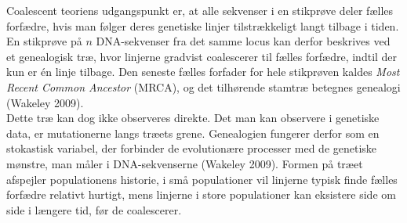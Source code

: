 \documentclass[
  10pt,
  a4paper,
]{scrbook}
\let\oldemph\emph
\renewcommand\emph[1]{\oldemph{\color{gray}#1}}
\begin{document}
Coalescent teoriens udgangspunkt er, at alle sekvenser i en stikprøve
deler fælles forfædre, hvis man følger deres genetiske linjer
tilstrækkeligt langt tilbage i tiden. En stikprøve på \(n\)
DNA-sekvenser fra det samme locus kan derfor beskrives ved et
genealogisk træ, hvor linjerne gradvist coalescerer til fælles forfædre,
indtil der kun er én linje tilbage. Den seneste fælles forfader for hele
stikprøven kaldes \emph{Most Recent Common Ancestor} (MRCA), og det
tilhørende stamtræ betegnes genealogi (Wakeley 2009).\\
Dette træ kan dog ikke observeres direkte. Det man kan observere i
genetiske data, er mutationerne langs træets grene. Genealogien fungerer
derfor som en stokastisk variabel, der forbinder de evolutionære
processer med de genetiske mønstre, man måler i DNA-sekvenserne (Wakeley
2009). Formen på træet afspejler populationens historie, i små
populationer vil linjerne typisk finde fælles forfædre relativt hurtigt,
mens linjerne i store populationer kan eksistere side om side i længere
tid, før de coalescerer.
\end{document}
